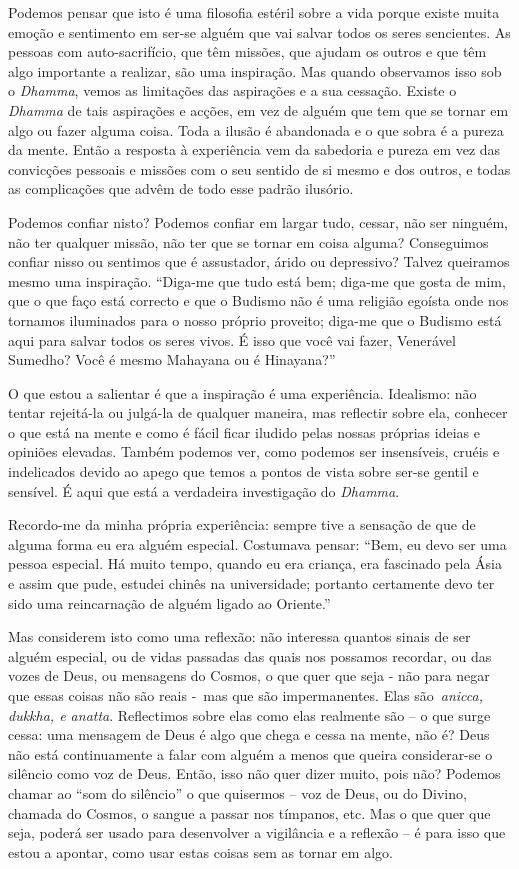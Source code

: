 Podemos pensar que isto é uma filosofia estéril sobre a vida porque
existe muita emoção e sentimento em ser-se alguém que vai salvar todos
os seres sencientes. As pessoas com auto-sacrifício, que têm missões,
que ajudam os outros e que têm algo importante a realizar, são uma
inspiração. Mas quando observamos isso sob o \emph{Dhamma}, vemos as
limitações das aspirações e a sua cessação. Existe o \emph{Dhamma} de
tais aspirações e acções, em vez de alguém que tem que se tornar em algo
ou fazer alguma coisa. Toda a ilusão é abandonada e o que sobra é a
pureza da mente. Então a resposta à experiência vem da sabedoria e
pureza em vez das convicções pessoais e missões com o seu sentido de si
mesmo e dos outros, e todas as complicações que advêm de todo esse
padrão ilusório.

Podemos confiar nisto? Podemos confiar em largar tudo, cessar, não ser
ninguém, não ter qualquer missão, não ter que se tornar em coisa alguma?
Conseguimos confiar nisso ou sentimos que é assustador, árido ou
depressivo? Talvez queiramos mesmo uma inspiração. ``Diga-me que tudo
está bem; diga-me que gosta de mim, que o que faço está correcto e que o
Budismo não é uma religião egoísta onde nos tornamos iluminados para o
nosso próprio proveito; diga-me que o Budismo está aqui para salvar
todos os seres vivos. É isso que você vai fazer, Venerável Sumedho? Você
é mesmo Mahayana ou é Hinayana?''

O que estou a salientar é que a inspiração é uma experiência. Idealismo:
não tentar rejeitá-la ou julgá-la de qualquer maneira, mas reflectir
sobre ela, conhecer o que está na mente e como é fácil ficar iludido
pelas nossas próprias ideias e opiniões elevadas. Também podemos ver,
como podemos ser insensíveis, cruéis e indelicados devido ao apego que
temos a pontos de vista sobre ser-se gentil e sensível. É aqui que está
a verdadeira investigação do \emph{Dhamma}.

Recordo-me da minha própria experiência: sempre tive a sensação de que
de alguma forma eu era alguém especial. Costumava pensar: ``Bem, eu devo
ser uma pessoa especial. Há muito tempo, quando eu era criança, era
fascinado pela Ásia e assim que pude, estudei chinês na universidade;
portanto certamente devo ter sido uma reincarnação de alguém ligado ao
Oriente.''

Mas considerem isto como uma reflexão: não interessa quantos sinais de
ser alguém especial, ou de vidas passadas das quais nos possamos
recordar, ou das vozes de Deus, ou mensagens do Cosmos, o que quer que
seja - não para negar que essas coisas não são reais -~mas que são
impermanentes. Elas são~\emph{anicca, dukkha, e anatta}. Reflectimos
sobre elas como elas realmente são -- o que surge cessa: uma mensagem de
Deus é algo que chega e cessa na mente, não é? Deus não está
continuamente a falar com alguém a menos que queira considerar-se o
silêncio como voz de Deus. Então, isso não quer dizer muito, pois não?
Podemos chamar ao ``som do silêncio'' o que quisermos -- voz de Deus, ou
do Divino, chamada do Cosmos, o sangue a passar nos tímpanos, etc. Mas o
que quer que seja, poderá ser usado para desenvolver a vigilância e a
reflexão -- é para isso que estou a apontar, como usar estas coisas sem
as tornar em algo.

